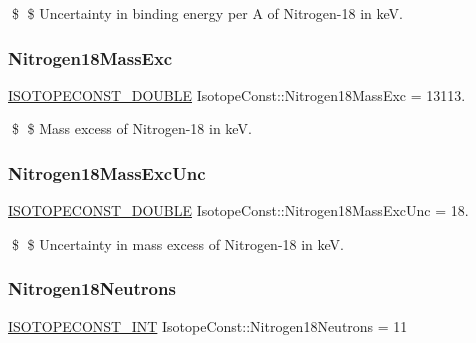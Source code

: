 \$ \$ Uncertainty in binding energy per A of Nitrogen-\/18 in keV. \mbox{\label{group___isotope_const-_nitrogen-_n18_gab65512d009dc45da52b492702b7e2917}} 
\subsubsection{\texorpdfstring{Nitrogen18\+Mass\+Exc}{Nitrogen18MassExc}}
{\footnotesize\ttfamily \mbox{\hyperlink{group___isotope_const-_macros_ga8f45a7272ce02c0b4c65c44636ed719a}{I\+S\+O\+T\+O\+P\+E\+C\+O\+N\+S\+T\+\_\+\+D\+O\+U\+B\+LE}} Isotope\+Const\+::\+Nitrogen18\+Mass\+Exc = 13113.}

\$ \$ Mass excess of Nitrogen-\/18 in keV. \mbox{\label{group___isotope_const-_nitrogen-_n18_ga6ebe05f46cef020db78c733cb399394b}} 
\subsubsection{\texorpdfstring{Nitrogen18\+Mass\+Exc\+Unc}{Nitrogen18MassExcUnc}}
{\footnotesize\ttfamily \mbox{\hyperlink{group___isotope_const-_macros_ga8f45a7272ce02c0b4c65c44636ed719a}{I\+S\+O\+T\+O\+P\+E\+C\+O\+N\+S\+T\+\_\+\+D\+O\+U\+B\+LE}} Isotope\+Const\+::\+Nitrogen18\+Mass\+Exc\+Unc = 18.}

\$ \$ Uncertainty in mass excess of Nitrogen-\/18 in keV. \mbox{\label{group___isotope_const-_nitrogen-_n18_gaf50e6340e1c6a8ca55fa02fe385c49a0}} 
\subsubsection{\texorpdfstring{Nitrogen18\+Neutrons}{Nitrogen18Neutrons}}
{\footnotesize\ttfamily \mbox{\hyperlink{group___isotope_const-_macros_ga5f18360b3e99483a35c32d789e62621c}{I\+S\+O\+T\+O\+P\+E\+C\+O\+N\+S\+T\+\_\+\+I\+NT}} Isotope\+Const\+::\+Nitrogen18\+Neutrons = 11}

